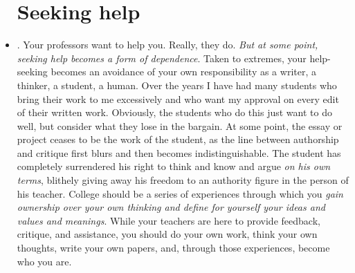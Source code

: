 \begin{itemize}


\section{Seeking help}

\item {}. Your professors want to help you. Really, they do. \emph{But at some point, seeking help becomes a form of dependence}. Taken to extremes, your help-seeking becomes an avoidance of your own responsibility as a writer, a thinker, a student, a human. Over the years I have had many students who bring their work to me excessively and who want my approval on every edit of their written work. Obviously, the students who do this just want to do well, but consider what they lose in the bargain. At some point, the essay or project ceases to be the work of the student, as the line between authorship and critique first blurs and then becomes indistinguishable. The student has completely surrendered his right to think and know and argue \emph{on his own terms}, blithely giving away his freedom to an authority figure in the person of his teacher. College should be a series of experiences through which you \emph{gain ownership over your own thinking and define for yourself your ideas and values and meanings}. While your teachers are here to provide feedback, critique, and assistance, you should do your own work, think your own thoughts, write your own papers, and, through those experiences, become who you are.  


\end{itemize}
